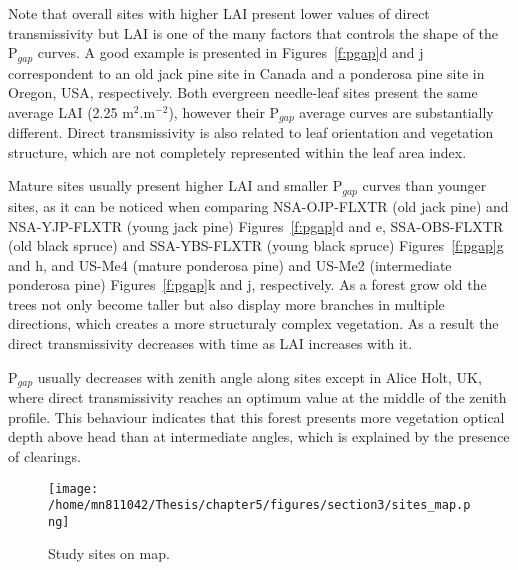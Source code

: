 Note that overall sites with higher LAI present lower values of direct transmissivity but LAI is one of the many factors that controls the shape of the P$_{gap}$ curves. A good example is presented in Figures~\ref{f:pgap}d and j correspondent to an old jack pine site in Canada and a ponderosa pine site in Oregon, USA, respectively. Both evergreen needle-leaf sites present the same average LAI (2.25 m$^2$.m$^{-2}$), however their P$_{gap}$ average curves are substantially different. Direct transmissivity is also related to leaf orientation and vegetation structure, which are not completely represented within the leaf area index.

Mature sites usually present higher LAI and smaller P$_{gap}$ curves than younger sites, as it can be noticed when comparing NSA-OJP-FLXTR (old jack pine) and NSA-YJP-FLXTR (young jack pine) Figures~\ref{f:pgap}d and e, SSA-OBS-FLXTR (old black spruce) and SSA-YBS-FLXTR (young black spruce) Figures~\ref{f:pgap}g and h, and US-Me4 (mature ponderosa pine) and US-Me2 (intermediate ponderosa pine) Figures~\ref{f:pgap}k and j, respectively. As a forest grow old the trees not only become taller but also display more branches in multiple directions, which creates a more structuraly complex vegetation. As a result the direct transmissivity decreases with time as LAI increases with it. 

P$_{gap}$ usually decreases with zenith angle along sites except in Alice Holt, UK, where direct transmissivity reaches an optimum value at the middle of the zenith profile. This behaviour indicates that this forest presents more vegetation optical depth above head than at intermediate angles, which is explained by the presence of clearings.


\begin{figure}[ht!]
\centering
\texttt{[image: /home/mn811042/Thesis/chapter5/figures/section3/sites\_map.png]}
\caption{Study sites on map.} 
\label{f:studysites}
\end{figure}

